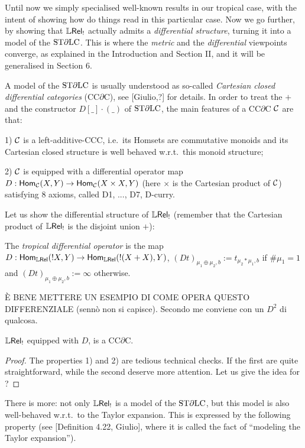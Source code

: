 Until now we simply specialised well-known results in our tropical case, with the intent of showing how do things read in this particular case.
Now we go further, by showing that $\mathbb{L} \mathsf{Rel}_!$ actually admits a \emph{differential structure}, turning it into a model of the $\mathrm{ST}\partial\mathrm{LC}$.
This is where the \emph{metric} and the \emph{differential} viewpoints converge, as explained in the Introduction and Section II, and it will be generalised in Section 6.

A model of the $\mathrm{ST}\partial\mathrm{LC}$ is usually understood as so-called \emph{Cartesian closed differential categories} (CC$\partial$C), see [Giulio,?] for details.
In order to treat the $+$ and the constructor $D[\_]\cdot (\_)$ of $\mathrm{ST}\partial\mathrm{LC}$, the main features of a CC$\partial$C $\mathcal{C}$ are that:

1) $\mathcal{C}$ is a left-additive-CCC, i.e.\ its Homsets are commutative monoids and its Cartesian closed structure is well behaved w.r.t.\ this monoid structure;

2) $\mathcal{C}$ is equipped with a differential operator map $D:\mathsf{Hom}_{\mathcal{C}}(X,Y)\to \mathsf{Hom}_{\mathcal{C}}(X\times X,Y)$ (here $\times$ is the Cartesian product of $\mathcal{C}$) satisfying $8$ axioms, called D1, ..., D7, D-curry.

Let us show the differential structure of $\mathbb{L} \mathsf{Rel}_!$ (remember that the Cartesian product of $\mathbb{L} \mathsf{Rel}_!$ is the disjoint union $+$): 
\begin{definition}
 The \emph{tropical differential operator} is the map $D:\mathsf{Hom}_{\mathbb{L} \mathsf{Rel}}(!X,Y)\to \mathsf{Hom}_{\mathbb{L} \mathsf{Rel}}(!(X+X),Y)$,
 $(Dt)_{\mu_1\oplus\mu_2,b}:=t_{\mu_2*\mu_1,b}$ if $\#\mu_1=1$ and $(Dt)_{\mu_1\oplus\mu_2,b}:=\infty$ otherwise.
\end{definition}

\begin{example}
 \`E BENE METTERE UN ESEMPIO DI COME OPERA QUESTO DIFFERENZIALE (senn\`o non si capisce).
 Secondo me conviene con un $D^2$ di qualcosa.
\end{example}

\begin{theorem}\label{thm:LREL!CCDC}
 $\mathbb{L} \mathsf{Rel}_!$ equipped with $D$, is a CC$\partial$C.
\end{theorem}
\begin{proof}
 The properties 1) and 2) are tedious technical checks.
 If the first are quite straightforward, while the second deserve more attention.
 Let us give the idea for ?
\end{proof}

There is more: not only $\mathbb{L} \mathsf{Rel}_!$ is a model of the $\mathrm{ST}\partial\mathrm{LC}$, but this model is also well-behaved w.r.t.\ to the \lamcalc Taylor expansion.
This is expressed by the following property (see [Definition 4.22, Giulio], where it is called the fact of ``modeling the Taylor expansion'').

